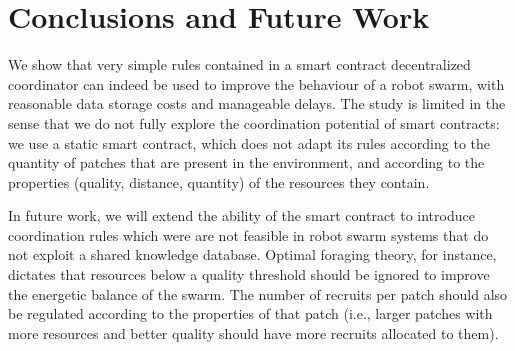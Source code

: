\documentclass[runningheads]{llncs}
\begin{document}


\section{Conclusions and Future Work}
\label{sec:conclusion}

We show that very simple rules contained in a smart contract decentralized coordinator can indeed be used to improve the behaviour of a robot swarm, with reasonable data storage costs and manageable delays. The study is limited in the sense that we do not fully explore the coordination potential of smart contracts: we use a static smart contract, which does not adapt its rules according to the quantity of patches that are present in the environment, and according to the properties (quality, distance, quantity) of the resources they contain.

In future work, we will extend the ability of the smart contract to introduce coordination rules which were are not feasible in robot swarm systems that do not exploit a shared knowledge database. Optimal foraging theory, for instance, dictates that resources below a quality threshold should be ignored to improve the energetic balance of the swarm. The number of recruits per patch should also be regulated according to the properties of that patch (i.e., larger patches with more resources and better quality should have more recruits allocated to them).





\end{document}
